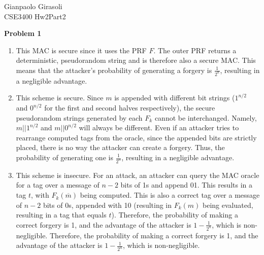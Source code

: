 \documentclass{article}
\begin{document}
\noindent Gianpaolo Girasoli\\
CSE3400 Hw2Part2

\textbf{Problem 1}\begin{enumerate}
	\item This MAC is secure since it uses the PRF $F$. The outer PRF returns a deterministic, pseudorandom string and is therefore also a secure MAC. This means that the attacker's probability of generating a forgery is $\frac{1}{2^n}$, resulting in a negligible advantage.
	\item This scheme is secure. Since $m$ is appended with different bit strings ($1^{n/2}$ and $0^{n/2}$ for the first and second halves respectively), the secure pseudorandom strings generated by each $F_k$ cannot be interchanged. Namely, $m||1^{n/2}$ and $m||0^{n/2}$ will always be different. Even if an attacker tries to rearrange computed tags from the oracle, since the appended bits are strictly placed, there is no way the attacker can create a forgery. Thus, the probability of generating one is $\frac{1}{2^n}$, resulting in a negligible advantage.
	\item This scheme is insecure. For an attack, an attacker can query the MAC oracle for a tag over a message of $n-2$ bits of 1s and append 01. This results in a tag $t$, with $F_k(\overline{m})$ being computed. This is also a correct tag over a message of $n-2$ bits of 0s, appended with 10 (resulting in $F_k(m)$ being evaluated, resulting in a tag that equals $t$). Therefore, the probability of making a correct forgery is 1, and the advantage of the attacker is $1-\frac{1}{2^n}$, which is non-negligible. Therefore, the probability of making a correct forgery is 1, and the advantage of the attacker is $1-\frac{1}{2^n}$, which is non-negligible.
\end{enumerate}
\end{document}
